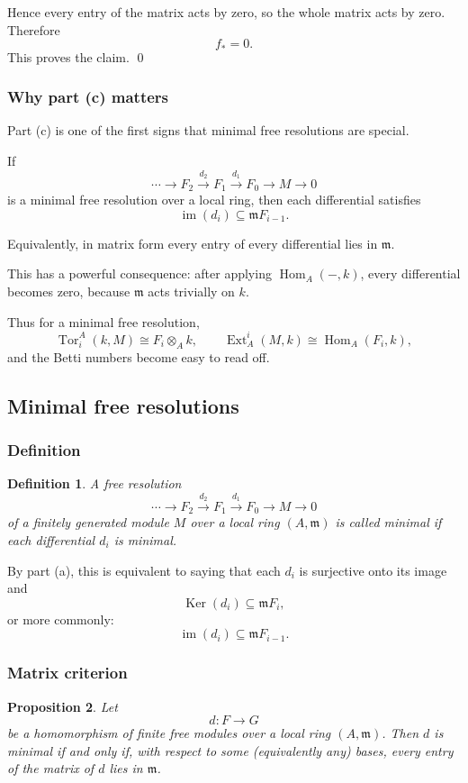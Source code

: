 \documentclass[12pt,a4paper]{article}
\theoremstyle{notespace}
\newtheorem{definition}{Definition}[section]
\DeclareMathOperator{\Hom}{Hom}
\DeclareMathOperator{\Ker}{Ker}
\DeclareMathOperator{\Tor}{Tor}
\DeclareMathOperator{\Ext}{Ext}
\DeclareMathOperator{\im}{im}
\newtheorem{proposition}[definition]{Proposition}
\newcommand{\m}{\mathfrak m}
\begin{document}
Hence every entry of the matrix acts by zero, so the whole matrix acts by zero. Therefore
\[
f_*=0.
\]
This proves the claim. \qed

\subsubsection{Why part (c) matters}

Part (c) is one of the first signs that minimal free resolutions are special.

If
\[
\cdots \to F_2 \xrightarrow{d_2} F_1 \xrightarrow{d_1} F_0 \to M \to 0
\]
is a minimal free resolution over a local ring, then each differential satisfies
\[
\im(d_i)\subseteq \m F_{i-1}.
\]

Equivalently, in matrix form every entry of every differential lies in \(\m\).

This has a powerful consequence: after applying \(\Hom_A(-,k)\), every differential becomes zero, because \(\m\) acts trivially on \(k\).

Thus for a minimal free resolution,
\[
\Tor_i^A(k,M)\cong F_i\otimes_A k,
\qquad
\Ext_A^i(M,k)\cong \Hom_A(F_i,k),
\]
and the Betti numbers become easy to read off.

\subsection{Minimal free resolutions}

\subsubsection{Definition}

\begin{definition}
	A free resolution
	\[
	\cdots \to F_2 \xrightarrow{d_2} F_1 \xrightarrow{d_1} F_0 \to M \to 0
	\]
	of a finitely generated module \(M\) over a local ring \((A,\m)\) is called \emph{minimal} if each differential \(d_i\) is minimal.
\end{definition}

By part (a), this is equivalent to saying that each \(d_i\) is surjective onto its image and
\[
\Ker(d_i)\subseteq \m F_i,
\]
or more commonly:
\[
\im(d_i)\subseteq \m F_{i-1}.
\]

\subsubsection{Matrix criterion}

\begin{proposition}
	Let
	\[
	d:F\to G
	\]
	be a homomorphism of finite free modules over a local ring \((A,\m)\). Then \(d\) is minimal if and only if, with respect to some (equivalently any) bases, every entry of the matrix of \(d\) lies in \(\m\).
\end{proposition}
\end{document}
